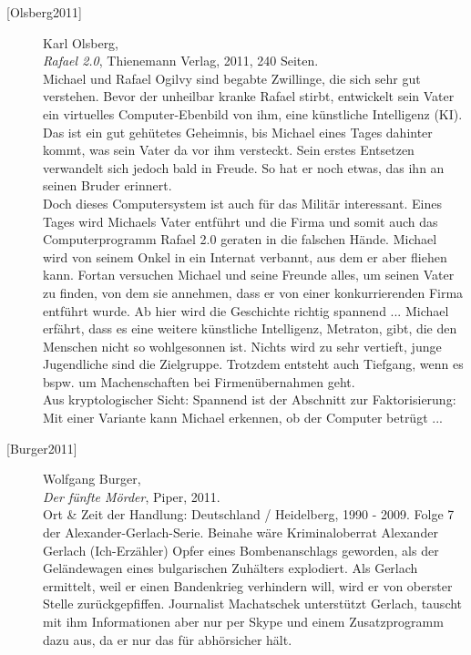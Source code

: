 \begin{refsegment}
\begin{description}
\item[\textrm{[Olsberg2011]}] 
    Karl Olsberg,\\
    {\em Rafael 2.0}, Thienemann Verlag, 2011, 240 Seiten.\\
    Michael und Rafael Ogilvy sind begabte Zwillinge, die sich sehr gut verstehen.
    Bevor der unheilbar kranke Rafael stirbt, entwickelt sein Vater ein virtuelles
    Computer-Ebenbild von ihm, eine künstliche Intelligenz (KI). Das ist ein gut
    gehütetes Geheimnis, bis Michael eines Tages dahinter kommt, was sein Vater da vor
    ihm versteckt. Sein erstes Entsetzen verwandelt sich jedoch bald in Freude.
    So hat er noch etwas, das ihn an seinen Bruder erinnert.\\
    Doch dieses Computersystem ist auch für das Militär interessant.
    Eines Tages wird Michaels Vater entführt und die
    Firma und somit auch das Computerprogramm Rafael 2.0 geraten in die falschen Hände.
    Michael wird von seinem Onkel in ein Internat verbannt, aus dem er aber fliehen kann.
    Fortan versuchen Michael und seine Freunde alles, um seinen Vater zu finden, von dem
    sie annehmen, dass er von einer konkurrierenden Firma entführt wurde. Ab hier wird
    die Geschichte richtig spannend ...
    Michael erfährt, dass es eine weitere künstliche Intelligenz, Metraton, gibt,
    die den Menschen nicht so wohlgesonnen ist.
    Nichts wird zu sehr vertieft, junge Jugendliche sind die Zielgruppe.
    Trotzdem entsteht auch Tiefgang, wenn es bspw. um Machenschaften bei Firmenübernahmen
    geht.\\
    Aus kryptologischer Sicht: Spannend ist der Abschnitt zur Faktorisierung: Mit einer
    Variante kann Michael erkennen, ob der Computer betrügt ...\\



\item[\textrm{[Burger2011]}] 
    Wolfgang Burger, \\
    {\em Der fünfte Mörder}, Piper, 2011. \\
    Ort \& Zeit der Handlung: Deutschland / Heidelberg, 1990 - 2009.
    Folge 7 der Alexander-Gerlach-Serie.
    Beinahe wäre Kriminaloberrat Alexander Gerlach (Ich-Erzähler) Opfer eines
    Bombenanschlags geworden, als der Geländewagen eines bulgarischen Zuhälters explodiert.
    Als Gerlach ermittelt, weil er einen Bandenkrieg verhindern will, wird er von oberster
    Stelle zurückgepfiffen.
    Journalist Machatschek unterstützt Gerlach, tauscht mit ihm Informationen aber nur
    per Skype und einem Zusatzprogramm dazu aus, da er nur das für abhörsicher hält.\\




\end{description}
\end{refsegment}
